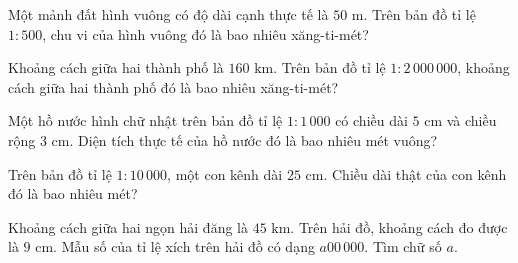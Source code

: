\begin{ex} %
Một mảnh đất hình vuông có độ dài cạnh thực tế là $50\text{ m}$. Trên bản đồ tỉ lệ $1 : 500$, chu vi của hình vuông đó là bao nhiêu xăng-ti-mét?
\end{ex}

\begin{ex} %
Khoảng cách giữa hai thành phố là $160\text{ km}$. Trên bản đồ tỉ lệ $1 : 2\,000\,000$, khoảng cách giữa hai thành phố đó là bao nhiêu xăng-ti-mét?
\end{ex}

\begin{ex} %
Một hồ nước hình chữ nhật trên bản đồ tỉ lệ $1 : 1\,000$ có chiều dài $5\text{ cm}$ và chiều rộng $3\text{ cm}$. Diện tích thực tế của hồ nước đó là bao nhiêu mét vuông?
\end{ex}

\begin{ex} %
Trên bản đồ tỉ lệ $1 : 10\,000$, một con kênh dài $25\text{ cm}$. Chiều dài thật của con kênh đó là bao nhiêu mét?
\end{ex}

\begin{ex} %
Khoảng cách giữa hai ngọn hải đăng là $45\text{ km}$. Trên hải đồ, khoảng cách đo được là $9\text{ cm}$. Mẫu số của tỉ lệ xích trên hải đồ có dạng $a00\,000$. Tìm chữ số $a$.
\end{ex}
